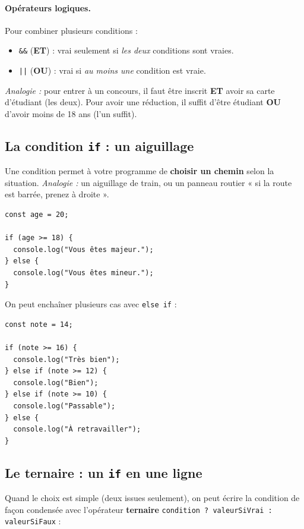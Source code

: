 \documentclass[11pt,a4paper]{article}
\newcommand{\code}[1]{\texttt{#1}}
\begin{document}
\paragraph{Opérateurs logiques.} Pour combiner plusieurs conditions :
\begin{itemize}[leftmargin=*,noitemsep]
  \item \code{\&\&} (\textbf{ET}) : vrai seulement si \emph{les deux} conditions sont vraies.
  \item \code{||} (\textbf{OU}) : vrai si \emph{au moins une} condition est vraie.
\end{itemize}
\emph{Analogie :} pour entrer à un concours, il faut être inscrit \textbf{ET} avoir sa carte d'étudiant (les deux). Pour avoir une réduction, il suffit d'être étudiant \textbf{OU} d'avoir moins de 18 ans (l'un suffit).

\subsection{La condition \code{if} : un aiguillage}

Une condition permet à votre programme de \textbf{choisir un chemin} selon la situation. \emph{Analogie :} un aiguillage de train, ou un panneau routier « si la route est barrée, prenez à droite ».

\begin{lstlisting}[style=js]
const age = 20;

if (age >= 18) {
  console.log("Vous êtes majeur.");
} else {
  console.log("Vous êtes mineur.");
}
\end{lstlisting}

On peut enchaîner plusieurs cas avec \code{else if} :

\begin{lstlisting}[style=js]
const note = 14;

if (note >= 16) {
  console.log("Très bien");
} else if (note >= 12) {
  console.log("Bien");
} else if (note >= 10) {
  console.log("Passable");
} else {
  console.log("À retravailler");
}
\end{lstlisting}

\subsection{Le ternaire : un \code{if} en une ligne}

Quand le choix est simple (deux issues seulement), on peut écrire la condition de façon condensée avec l'opérateur \textbf{ternaire} \code{condition ? valeurSiVrai : valeurSiFaux} :
\end{document}

